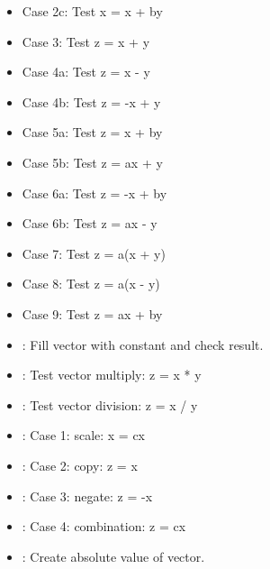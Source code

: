 \documentclass[letterpaper,10pt,english]{sphinxmanual}
\begin{document}
\begin{itemize}
\item {} 
 Case 2c: Test x =  x + by

\item {} 
 Case 3:  Test z =  x + y

\item {} 
 Case 4a: Test z =  x - y

\item {} 
 Case 4b: Test z = -x + y

\item {} 
 Case 5a: Test z =  x + by

\item {} 
 Case 5b: Test z = ax + y

\item {} 
 Case 6a: Test z = -x + by

\item {} 
 Case 6b: Test z = ax - y

\item {} 
 Case 7:  Test z = a(x + y)

\item {} 
 Case 8:  Test z = a(x - y)

\item {} 
 Case 9:  Test z = ax + by

\item {} 
: Fill vector with constant and check result.

\item {} 
: Test vector multiply: z = x * y

\item {} 
: Test vector division: z = x / y

\item {} 
: Case 1: scale: x = cx

\item {} 
: Case 2: copy: z = x

\item {} 
: Case 3: negate: z = -x

\item {} 
: Case 4: combination: z = cx

\item {} 
: Create absolute value of vector.


\end{itemize}
\end{document}
